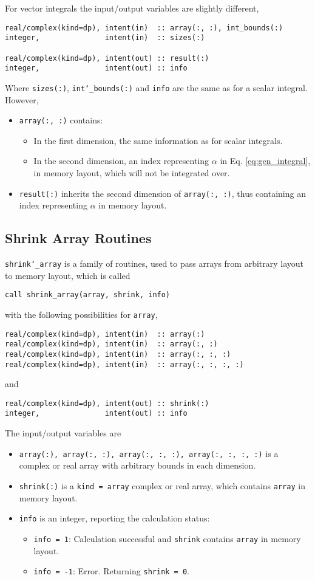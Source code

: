 \documentclass[12pt,a4paper]{article}
\begin{document}
For vector integrals the input/output variables are slightly different,
\begin{verbatim}
real/complex(kind=dp), intent(in)  :: array(:, :), int_bounds(:)
integer,               intent(in)  :: sizes(:)
    
real/complex(kind=dp), intent(out) :: result(:)
integer,               intent(out) :: info
\end{verbatim}
Where {\tt sizes(:)}, {\tt int\char`_bounds(:)} and {\tt info} are the same as for a scalar integral. However,
\begin{itemize}
\item {\tt array(:, :)} contains:
\begin{itemize}
\item In the first dimension, the same information as for scalar integrals.
\item In the second dimension, an index representing $\alpha$ in Eq. \eqref{eq:gen_integral}, in memory layout, which will not be integrated over.
\end{itemize}
\item {\tt result(:)} inherits the second dimension of {\tt array(:, :)}, thus containing an index representing $\alpha$ in memory layout.
\end{itemize}
\subsection{Shrink Array Routines}
{\tt shrink\char`_array} is a family of routines, used to pass arrays from arbitrary layout to memory layout, which is called
\begin{verbatim}
call shrink_array(array, shrink, info)
\end{verbatim}
with the following possibilities for {\tt array},
\begin{verbatim}
real/complex(kind=dp), intent(in)  :: array(:)
real/complex(kind=dp), intent(in)  :: array(:, :)
real/complex(kind=dp), intent(in)  :: array(:, :, :)
real/complex(kind=dp), intent(in)  :: array(:, :, :, :)
\end{verbatim}
and 
\begin{verbatim}
real/complex(kind=dp), intent(out) :: shrink(:)
integer,               intent(out) :: info
\end{verbatim}
The input/output variables are
\begin{itemize}
\item {\tt array(:), array(:, :), array(:, :, :), array(:, :, :, :)} is a complex or real array with arbitrary bounds in each dimension.
\item {\tt shrink(:)} is a {\tt kind = array} complex or real array, which contains {\tt array} in memory layout.
\item {\tt info} is an integer, reporting the calculation status:
\begin{itemize}
\item {\tt info = 1}: Calculation successful and {\tt shrink} contains {\tt array} in memory layout.
\item {\tt info = -1}: Error. Returning {\tt shrink = 0}.
\end{itemize}
\end{itemize}
\end{document}
